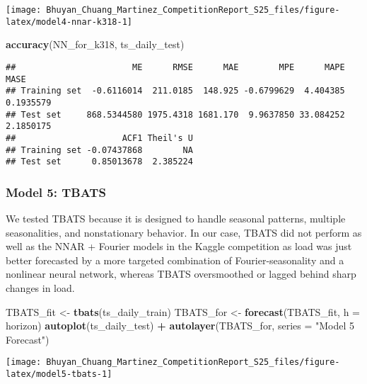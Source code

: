 \documentclass[
]{article}
\newenvironment{Shaded}{\begin{snugshade}}{\end{snugshade}}
\newcommand{\AttributeTok}[1]{\textcolor[rgb]{0.13,0.29,0.53}{#1}}
\newcommand{\FunctionTok}[1]{\textcolor[rgb]{0.13,0.29,0.53}{\textbf{#1}}}
\newcommand{\NormalTok}[1]{#1}
\newcommand{\OtherTok}[1]{\textcolor[rgb]{0.56,0.35,0.01}{#1}}
\newcommand{\SpecialCharTok}[1]{\textcolor[rgb]{0.81,0.36,0.00}{\textbf{#1}}}
\newcommand{\StringTok}[1]{\textcolor[rgb]{0.31,0.60,0.02}{#1}}
\begin{document}
\begin{center}\texttt{[image: Bhuyan\_Chuang\_Martinez\_CompetitionReport\_S25\_files/figure-latex/model4-nnar-k318-1]} \end{center}

\begin{Shaded}
\begin{Highlighting}[]
\FunctionTok{accuracy}\NormalTok{(NN\_for\_k318, ts\_daily\_test)}
\end{Highlighting}
\end{Shaded}

\begin{verbatim}
##                       ME      RMSE      MAE        MPE      MAPE      MASE
## Training set  -0.6116014  211.0185  148.925 -0.6799629  4.404385 0.1935579
## Test set     868.5344580 1975.4318 1681.170  9.9637850 33.084252 2.1850175
##                     ACF1 Theil's U
## Training set -0.07437868        NA
## Test set      0.85013678  2.385224
\end{verbatim}

\subsubsection{Model 5: TBATS}\label{model-5-tbats}

We tested TBATS because it is designed to handle seasonal patterns,
multiple seasonalities, and nonstationary behavior. In our case, TBATS
did not perform as well as the NNAR + Fourier models in the Kaggle
competition as load was just better forecasted by a more targeted
combination of Fourier-seasonality and a nonlinear neural network,
whereas TBATS oversmoothed or lagged behind sharp changes in load.

\begin{Shaded}
\begin{Highlighting}[]
\NormalTok{TBATS\_fit }\OtherTok{\textless{}{-}} \FunctionTok{tbats}\NormalTok{(ts\_daily\_train)}
\NormalTok{TBATS\_for }\OtherTok{\textless{}{-}} \FunctionTok{forecast}\NormalTok{(TBATS\_fit, }\AttributeTok{h =}\NormalTok{ horizon)}
\FunctionTok{autoplot}\NormalTok{(ts\_daily\_test) }\SpecialCharTok{+} \FunctionTok{autolayer}\NormalTok{(TBATS\_for, }\AttributeTok{series =} \StringTok{"Model 5 Forecast"}\NormalTok{)}
\end{Highlighting}
\end{Shaded}

\begin{center}\texttt{[image: Bhuyan\_Chuang\_Martinez\_CompetitionReport\_S25\_files/figure-latex/model5-tbats-1]} \end{center}
\end{document}
